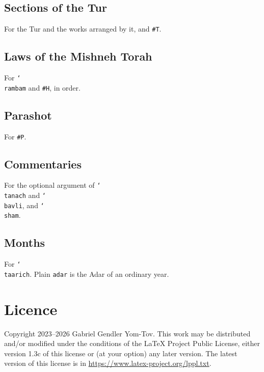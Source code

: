 \documentclass[11pt]{article}
\newcommand{\cs}[1]{\texttt{\char`\\#1}}
\begin{document}
\subsection{Sections of the Tur}
For the Tur and the works arranged by it, and \verb|#T|.

\subsection{Laws of the Mishneh Torah}
For \cs{rambam} and \verb|#H|, in order.

\subsection{Parashot}
For \verb|#P|.

\subsection{Commentaries}
For the optional argument of \cs{tanach} and \cs{bavli}, and \cs{sham}.

\subsection{Months}
For \cs{taarich}. Plain \texttt{adar} is the Adar of an ordinary year.

\section{Licence}

Copyright 2023--2026 Gabriel Gendler Yom-Tov. This work may be distributed and/or modified under
the conditions of the \LaTeX{} Project Public License, either version 1.3c of this license or (at
your option) any later version. The latest version of this license is in
\url{https://www.latex-project.org/lppl.txt}.
\end{document}
